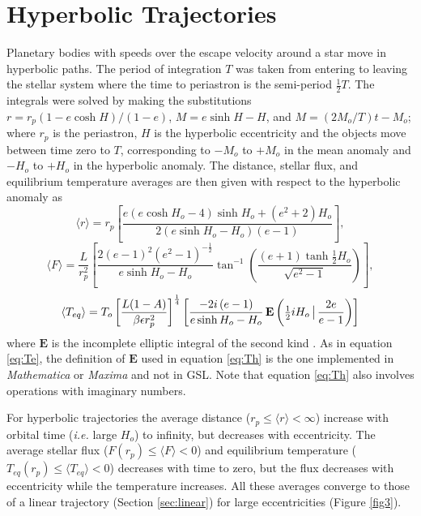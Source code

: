 \documentclass[a4paper,fleqn,usenatbib]{mnras}
\begin{document}

\section{Hyperbolic Trajectories}
\label{sec:hyperbolic}

Planetary bodies with speeds over the escape velocity around a star move in hyperbolic paths. The period of integration $T$ was taken from entering to leaving the stellar system where the time to periastron is the semi-period $\frac{1}{2}T$. The integrals were solved by making the substitutions $r=r_p(1-e\cosh{H})/(1-e)$, $M=e\sinh{H} - H$, and $M=(2M_o/T)t - M_o$; where $r_p$ is the periastron, $H$ is the hyperbolic eccentricity and the objects move between time zero to $T$, corresponding to $-M_o$ to $+M_o$ in the mean anomaly and $-H_o$ to $+H_o$ in the hyperbolic anomaly. The distance, stellar flux, and equilibrium temperature averages are then given with respect to the hyperbolic anomaly as
\begin{equation} \label{eq:rh}
\langle r \rangle = r_p \left[\frac{e \left(e \cosh{H_o} - 4\right) \sinh{H_o} + \left(e^{2} + 2\right) H_o}{2\left(e \sinh{H_o} - H_o\right) \left( e-1 \right) } \right],
\end{equation}
\begin{equation} \label{eq:Fh}
\langle F \rangle = \frac{L}{r_p^2} \left[ \frac{2 \left( e - 1 \right)^2 \left(e^2 - 1\right)^{-\frac{1}{2}}}{e \sinh{H_o} - H_o}\tan^{-1}\left({\frac{\left(e + 1\right) \tanh{\frac{1}{2}H_o}}{\sqrt{e^2 - 1}}}\right) \right],
\end{equation}
\begin{equation} \label{eq:Th}
\langle T_{eq} \rangle = T_o \left[\frac{L {\left(1 - A\right)}}{\beta \epsilon r_p^{2}}\right]^{\frac{1}{4}} \left[ \frac{-2 i \left(e-1\right)}{e \sinh{H_o} - H_o} \, {\rm \mathbf{E}}\left(\tfrac{1}{2}iH_o \, \big| \, \frac{2e}{e - 1}\right) \right]
\end{equation}
where $\mathbf{E}$ is the incomplete elliptic integral of the second kind \citep{MathWorld, GSL}. As in equation \ref{eq:Te}, the definition of $\mathbf{E}$ used in equation \ref{eq:Th} is the one implemented in \emph{Mathematica} or \emph{Maxima} and not in GSL. Note that equation \ref{eq:Th} also involves operations with imaginary numbers.

For hyperbolic trajectories the average distance ($r_p \leq \langle r \rangle < \infty$) increase with orbital time (\emph{i.e.} large $H_o$) to infinity, but decreases with eccentricity. The average stellar flux ($F(r_p) \leq \langle F \rangle < 0$) and equilibrium temperature ($T_{eq}(r_p) \leq \langle T_{eq} \rangle < 0$) decreases with time to zero, but the flux decreases with eccentricity while the temperature increases. All these averages converge to those of a linear trajectory (Section \ref{sec:linear}) for large eccentricities (Figure \ref{fig3}).
\end{document}

